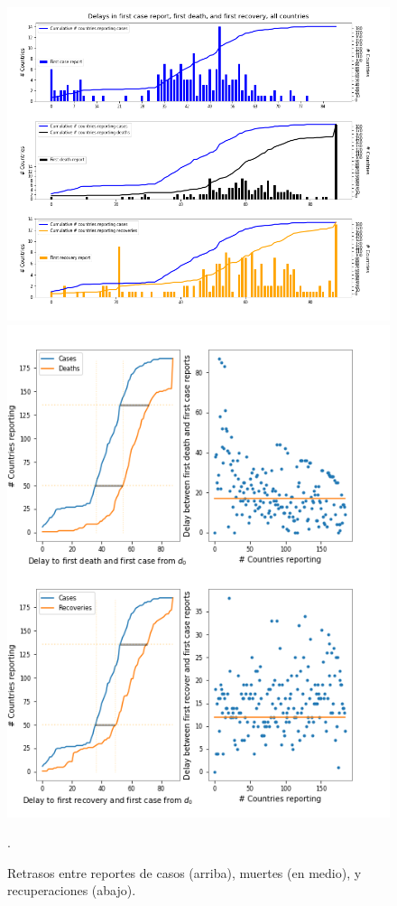 %
\begin{figure}[h]
\begin{minipage}{0.5\textwidth}
\includegraphics[width=\textwidth]{../tsam_Covid19_analysis/figures/tsam_Covid19_JHU_reportArrivals_AllCountries}
\end{minipage}%
\begin{minipage}{0.5\textwidth}
\includegraphics[width=\textwidth]
{../tsam_Covid19_analysis/figures/tsam_Covid19_JHU_delays_caseDeaths}
\end{minipage}%
\caption{Retrasos entre reportes de casos (arriba), muertes (en medio), y recuperaciones (abajo). }. \label{fig:reportArrivals}
\end{figure}


